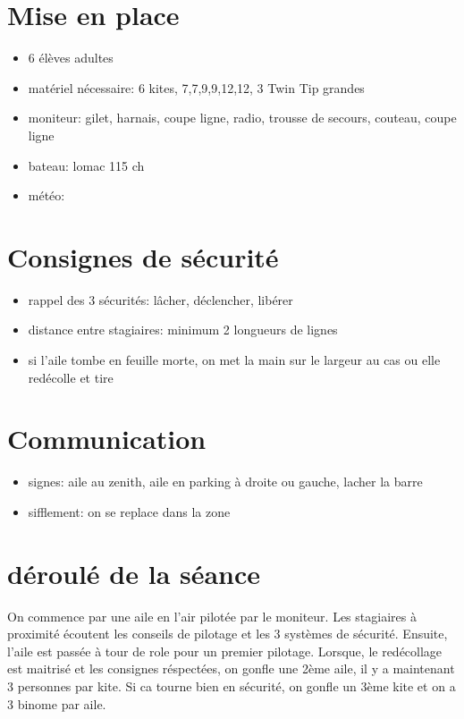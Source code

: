 \documentclass[12pt,a4paper]{report}
\begin{document}
\section{Mise en place}
\begin{itemize}
\item 6 élèves adultes
\item matériel nécessaire: 6 kites, 7,7,9,9,12,12, 3 Twin Tip grandes
\item moniteur: gilet, harnais, coupe ligne, radio, trousse de secours, couteau, coupe ligne
\item bateau: lomac 115 ch
\item météo: 
\end{itemize}
\section{Consignes de sécurité}
\begin{itemize}
\item rappel des 3 sécurités: lâcher, déclencher, libérer
\item distance entre stagiaires: minimum 2 longueurs de lignes
\item si l'aile tombe en feuille morte, on met la main sur le largeur au cas ou elle redécolle et tire
\end{itemize}
\section{Communication}
\begin{itemize}
\item signes: aile au zenith, aile en parking à droite ou gauche, lacher la barre
\item sifflement: on se replace dans la zone
\end{itemize}
\section{déroulé de la séance}
On commence par une aile en l'air pilotée par le moniteur.
Les stagiaires à proximité écoutent les conseils de pilotage et les 3 systèmes
de sécurité.
Ensuite, l'aile est passée à tour de role pour un premier pilotage.
Lorsque, le redécollage est maitrisé et les consignes réspectées, 
on gonfle une 2ème aile, il y a maintenant 3 personnes par kite.
Si ca tourne bien en sécurité, on gonfle un 3ème kite et on a 3 binome par aile.


\end{document}
